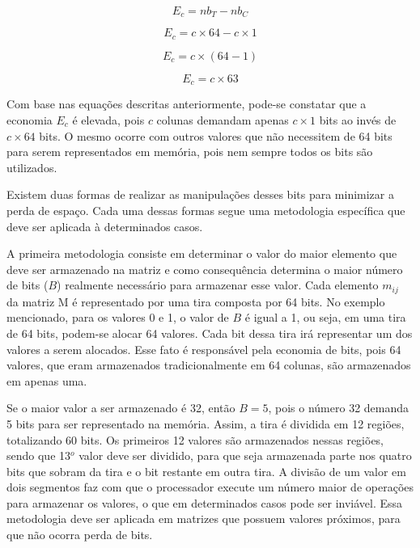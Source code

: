\documentclass[a4paper,11pt]{article}
\begin{document}
\begin{equation}
 E_c = nb_T - nb_C
\end{equation}

\begin{equation}
 E_c =  c \times 64 - c \times 1
\end{equation}

\begin{equation}
 E_c =  c \times (64 -  1)
\end{equation}

\begin{equation}
 E_c =  c \times 63
\end{equation}

Com base nas equações descritas anteriormente, pode-se constatar que a
economia $E_c$ é elevada, pois $c$ colunas demandam apenas $c \times 1$ bits ao
invés de $c \times 64$ bits. O mesmo ocorre com outros valores que não
necessitem de 
64 bits para serem representados em memória, pois nem sempre todos os bits são
utilizados.

Existem duas formas de realizar as manipulações desses bits para minimizar
a perda de espa\c co. Cada
uma dessas formas segue uma metodologia específica que deve ser aplicada
à determinados casos. 

A primeira metodologia consiste em determinar o valor do maior elemento que deve 
ser armazenado na matriz e como consequência determina o maior número de bits ($B$) realmente necessário para 
armazenar esse valor. Cada elemento $m_{ij}$ da matriz M é representado por uma tira composta por 64 bits. No 
exemplo mencionado, para os valores 0 e 1, o valor de $B$ é igual a 1, ou seja,
em uma tira de 64 bits, podem-se alocar 64 valores. Cada bit
dessa tira irá representar um dos valores a serem alocados. Esse fato é
responsável pela economia de bits, pois 64 valores, 
que eram armazenados tradicionalmente em 64 colunas, são 
armazenados em apenas uma. 

Se o maior valor a ser armazenado é 32, então $B = 5$, pois o número
32 demanda
5 bits para ser representado na memória. Assim, a tira é dividida em 12
regiões, totalizando 60 bits. Os primeiros 12 
valores são armazenados nessas regiões, sendo que  13$^o$ valor 
deve ser dividido, para que seja armazenada parte nos quatro bits que
sobram da tira e o bit restante em outra tira. A divisão de um valor em dois
segmentos faz com que o processador execute um número maior de 
operações para armazenar os valores, o que em determinados casos pode ser
inviável. 
Essa metodologia deve ser aplicada em matrizes que possuem valores próximos,
para que não ocorra perda de bits.
\end{document}
